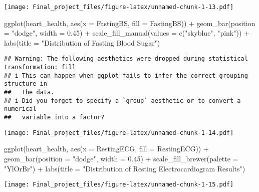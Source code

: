 \documentclass[
]{article}
\newenvironment{Shaded}{\begin{snugshade}}{\end{snugshade}}
\newcommand{\AttributeTok}[1]{\textcolor[rgb]{0.77,0.63,0.00}{#1}}
\newcommand{\FloatTok}[1]{\textcolor[rgb]{0.00,0.00,0.81}{#1}}
\newcommand{\FunctionTok}[1]{\textcolor[rgb]{0.00,0.00,0.00}{#1}}
\newcommand{\NormalTok}[1]{#1}
\newcommand{\SpecialCharTok}[1]{\textcolor[rgb]{0.00,0.00,0.00}{#1}}
\newcommand{\StringTok}[1]{\textcolor[rgb]{0.31,0.60,0.02}{#1}}
\begin{document}
\texttt{[image: Final\_project\_files/figure-latex/unnamed-chunk-1-13.pdf]}

\begin{Shaded}
\begin{Highlighting}[]
\FunctionTok{ggplot}\NormalTok{(heart\_health, }\FunctionTok{aes}\NormalTok{(}\AttributeTok{x =}\NormalTok{ FastingBS, }\AttributeTok{fill =}\NormalTok{ FastingBS)) }\SpecialCharTok{+}
  \FunctionTok{geom\_bar}\NormalTok{(}\AttributeTok{position =} \StringTok{"dodge"}\NormalTok{, }\AttributeTok{width =} \FloatTok{0.45}\NormalTok{) }\SpecialCharTok{+}
  \FunctionTok{scale\_fill\_manual}\NormalTok{(}\AttributeTok{values =} \FunctionTok{c}\NormalTok{(}\StringTok{"skyblue"}\NormalTok{, }\StringTok{"pink"}\NormalTok{)) }\SpecialCharTok{+}
  \FunctionTok{labs}\NormalTok{(}\AttributeTok{title =} \StringTok{"Distribution of Fasting Blood Sugar"}\NormalTok{)}
\end{Highlighting}
\end{Shaded}

\begin{verbatim}
## Warning: The following aesthetics were dropped during statistical transformation: fill
## i This can happen when ggplot fails to infer the correct grouping structure in
##   the data.
## i Did you forget to specify a `group` aesthetic or to convert a numerical
##   variable into a factor?
\end{verbatim}

\texttt{[image: Final\_project\_files/figure-latex/unnamed-chunk-1-14.pdf]}

\begin{Shaded}
\begin{Highlighting}[]
\FunctionTok{ggplot}\NormalTok{(heart\_health, }\FunctionTok{aes}\NormalTok{(}\AttributeTok{x =}\NormalTok{ RestingECG, }\AttributeTok{fill =}\NormalTok{ RestingECG)) }\SpecialCharTok{+}
  \FunctionTok{geom\_bar}\NormalTok{(}\AttributeTok{position =} \StringTok{"dodge"}\NormalTok{, }\AttributeTok{width =} \FloatTok{0.45}\NormalTok{) }\SpecialCharTok{+}
  \FunctionTok{scale\_fill\_brewer}\NormalTok{(}\AttributeTok{palette =} \StringTok{"YlOrBr"}\NormalTok{) }\SpecialCharTok{+}
  \FunctionTok{labs}\NormalTok{(}\AttributeTok{title =} \StringTok{"Distribution of Resting Electrocardiogram Results"}\NormalTok{)}
\end{Highlighting}
\end{Shaded}

\texttt{[image: Final\_project\_files/figure-latex/unnamed-chunk-1-15.pdf]}
\end{document}
